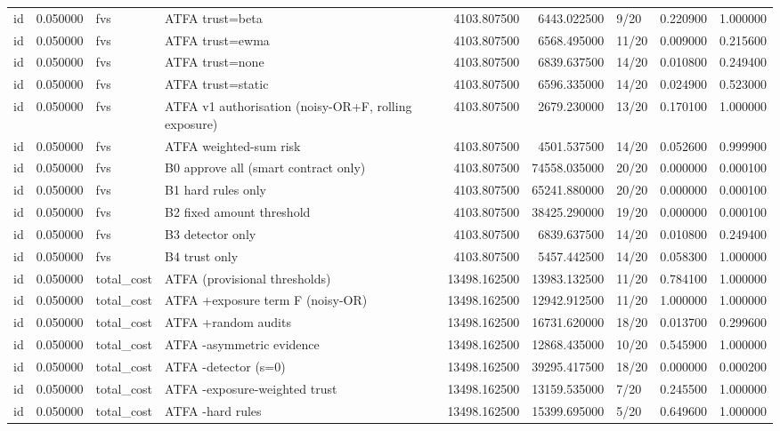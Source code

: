 \begin{tabular}{lrllrrlrr}
id & 0.050000 & fvs & ATFA trust=beta & 4103.807500 & 6443.022500 & 9/20 & 0.220900 & 1.000000 \\
id & 0.050000 & fvs & ATFA trust=ewma & 4103.807500 & 6568.495000 & 11/20 & 0.009000 & 0.215600 \\
id & 0.050000 & fvs & ATFA trust=none & 4103.807500 & 6839.637500 & 14/20 & 0.010800 & 0.249400 \\
id & 0.050000 & fvs & ATFA trust=static & 4103.807500 & 6596.335000 & 14/20 & 0.024900 & 0.523000 \\
id & 0.050000 & fvs & ATFA v1 authorisation (noisy-OR+F, rolling exposure) & 4103.807500 & 2679.230000 & 13/20 & 0.170100 & 1.000000 \\
id & 0.050000 & fvs & ATFA weighted-sum risk & 4103.807500 & 4501.537500 & 14/20 & 0.052600 & 0.999900 \\
id & 0.050000 & fvs & B0 approve all (smart contract only) & 4103.807500 & 74558.035000 & 20/20 & 0.000000 & 0.000100 \\
id & 0.050000 & fvs & B1 hard rules only & 4103.807500 & 65241.880000 & 20/20 & 0.000000 & 0.000100 \\
id & 0.050000 & fvs & B2 fixed amount threshold & 4103.807500 & 38425.290000 & 19/20 & 0.000000 & 0.000100 \\
id & 0.050000 & fvs & B3 detector only & 4103.807500 & 6839.637500 & 14/20 & 0.010800 & 0.249400 \\
id & 0.050000 & fvs & B4 trust only & 4103.807500 & 5457.442500 & 14/20 & 0.058300 & 1.000000 \\
id & 0.050000 & total\_cost & ATFA (provisional thresholds) & 13498.162500 & 13983.132500 & 11/20 & 0.784100 & 1.000000 \\
id & 0.050000 & total\_cost & ATFA +exposure term F (noisy-OR) & 13498.162500 & 12942.912500 & 11/20 & 1.000000 & 1.000000 \\
id & 0.050000 & total\_cost & ATFA +random audits & 13498.162500 & 16731.620000 & 18/20 & 0.013700 & 0.299600 \\
id & 0.050000 & total\_cost & ATFA -asymmetric evidence & 13498.162500 & 12868.435000 & 10/20 & 0.545900 & 1.000000 \\
id & 0.050000 & total\_cost & ATFA -detector (s=0) & 13498.162500 & 39295.417500 & 18/20 & 0.000000 & 0.000200 \\
id & 0.050000 & total\_cost & ATFA -exposure-weighted trust & 13498.162500 & 13159.535000 & 7/20 & 0.245500 & 1.000000 \\
id & 0.050000 & total\_cost & ATFA -hard rules & 13498.162500 & 15399.695000 & 5/20 & 0.649600 & 1.000000 \\

\end{tabular}
